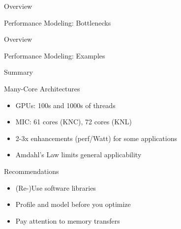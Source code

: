 \begin{frame}{Overview} \begin{center} \Large Performance Modeling: Bottlenecks \end{center} \end{frame}

\begin{frame}{Overview} \begin{center} \Large Performance Modeling: Examples \end{center} \end{frame}




\begin{frame}{Summary}

 \begin{block}{Many-Core Architectures}
   \begin{itemize}
    \item GPUs: 100s and 1000s of threads
    \item MIC: 61 cores (KNC), 72 cores (KNL)
    \item 2-3x enhancements (perf/Watt) for some applications
    \item Amdahl's Law limits general applicability
   \end{itemize}
 \end{block}

 \begin{block}{Recommendations}
   \begin{itemize}
    \item (Re-)Use software libraries
    \item Profile and model before you optimize
    \item Pay attention to memory transfers
   \end{itemize}
 \end{block}

\end{frame}

